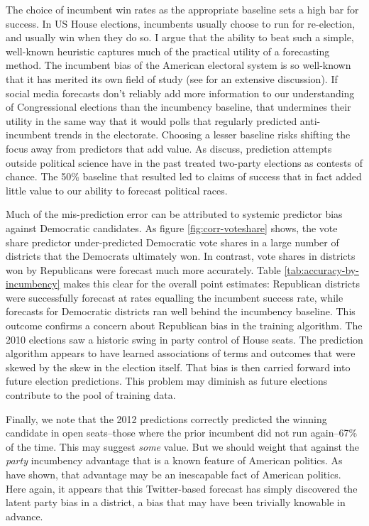 \documentclass{article}
\begin{document}
The choice of incumbent win rates as the appropriate baseline sets a
high bar for success. In US House elections, incumbents usually choose
to run for re-election, and usually win when they do so. I argue that the
ability to beat such a simple, well-known heuristic captures much of the
practical utility of a forecasting method. The incumbent bias of the
American electoral system is so well-known that it has merited its own
field of study (see \cite{caughey2011elections} for an extensive
discussion). If social media forecasts don't reliably add more
information to our understanding of Congressional elections than the
incumbency baseline, that undermines their utility in the same way
that it would polls that regularly predicted anti-incumbent trends in
the electorate. Choosing a lesser baseline risks shifting the focus
away from predictors that add value. As \cite{metaxas2011not} discuss,
prediction attempts outside political science have in the past treated
two-party elections as contests of chance. The 50\% baseline that
resulted led to claims of success that in fact added little value to
our ability to forecast political races.

Much of the mis-prediction error can be attributed to systemic
predictor bias against Democratic candidates. As figure
\ref{fig:corr-voteshare} shows, the vote share predictor
under-predicted Democratic vote shares in a large number of districts
that the Democrats ultimately won. In contrast, vote shares in districts
won by Republicans were forecast much more accurately. Table
\ref{tab:accuracy-by-incumbency} makes this clear for the overall
point estimates: Republican districts were successfully forecast at
rates equalling the incumbent success rate, while forecasts for
Democratic districts ran well behind the incumbency baseline. This outcome
confirms a concern about Republican bias in the training
algorithm. The 2010 elections saw a historic swing in party control of
House seats. The prediction algorithm appears to have learned
associations of terms and outcomes that were skewed by the skew in the
election itself. That bias is then carried forward into future
election predictions. This problem
may diminish as future elections contribute to the pool of training data.

Finally, we note that the 2012 predictions correctly predicted the winning
candidate in open seats--those where the prior incumbent did not run
again--67\% of the time. This may suggest \textit{some} value. But we
should weight that against the \textit{party} incumbency
advantage that is a known feature of American politics. As
\cite{caughey2011elections} have shown, that advantage may be an
inescapable fact of American politics. Here again, it appears that
this Twitter-based forecast has simply discovered the latent party
bias in a district, a bias that may have been trivially knowable in
advance. 
\end{document}
